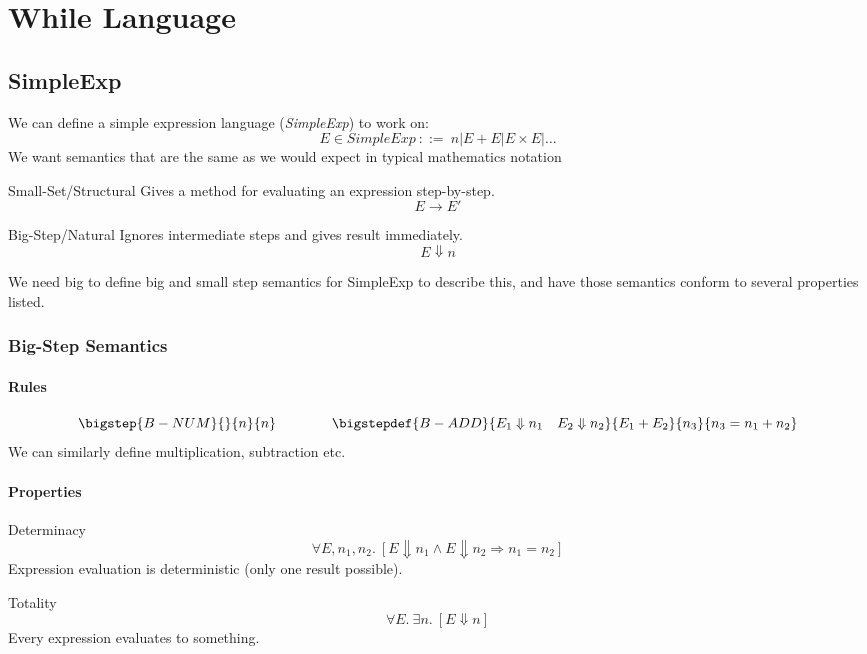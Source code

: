 \chapter{While Language}

\section{SimpleExp}
We can define a simple expression language (\textit{SimpleExp}) to work on:
\[E \in SimpleExp \ ::= \ n | E + E | E \times E | \dots\]
We want semantics that are the same as we would expect in typical mathematics notation
\begin{tcbraster}[raster columns=2,raster equal height]
    \begin{definitionbox}{Small-Set/Structural}
        Gives a method for evaluating an expression step-by-step.
        \[E \to E'\]
    \end{definitionbox}
    \begin{definitionbox}{Big-Step/Natural}
        Ignores intermediate steps and gives result immediately.
        \[E \Downarrow n\]
    \end{definitionbox}
\end{tcbraster}
\noindent We need big to define big and small step semantics for SimpleExp to describe this, and have those semantics conform to several properties listed.

\subsection{Big-Step Semantics}
\subsubsection{Rules}
\[\bigstep{B-NUM}{}{n}{n} \qquad \qquad \bigstepdef{B-ADD}{E_1 \Downarrow n_1 \quad E_2 \Downarrow n_2}{E_1 + E_2}{n_3}{n_3 = n_1 + n_2}\]
We can similarly define multiplication, subtraction etc.
\subsubsection{Properties}
\begin{tcbraster}[raster columns=2,raster equal height]
    \begin{definitionbox}{Determinacy}
        \[\forall E, n_1, n_2 . \ [E \Downarrow n_1 \land E \Downarrow n_2 \Rightarrow n_1 = n_2]\]
    Expression evaluation is deterministic (only one result possible).
    \end{definitionbox}
    \begin{definitionbox}{Totality}
        \[\forall E. \ \exists n . \ [E \Downarrow n] \]
        Every expression evaluates to something.    
    \end{definitionbox}
\end{tcbraster}

